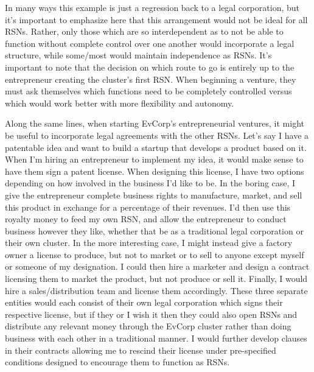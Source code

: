 \documentclass{article}[10pt]
\begin{document}
In many ways this example is just a regression back to a legal corporation, but it's important to emphasize here that this arrangement would not be ideal for all RSNs.
Rather, only those which are so interdependent as to not be able to function without complete control over one another would incorporate a legal structure, while some/most would maintain independence as RSNs.
It's important to note that the decision on which route to go is entirely up to the entrepreneur creating the cluster's first RSN.
When beginning a venture, they must ask themselves which functions need to be completely controlled versus which would work better with more flexibility and autonomy.\par

Along the same lines, when starting EvCorp's entrepreneurial ventures, it might be useful to incorporate legal agreements with the other RSNs.
Let's say I have a patentable idea and want to build a startup that develops a product based on it.
When I'm hiring an entrepreneur to implement my idea, it would make sense to have them sign a patent license.
When designing this license, I have two options depending on how involved in the business I'd like to be.
In the boring case, I give the entrepreneur complete business rights to manufacture, market, and sell this product in exchange for a percentage of their revenues.
I'd then use this royalty money to feed my own RSN, and allow the entrepreneur to conduct business however they like, whether that be as a traditional legal corporation or their own cluster.
In the more interesting case, I might instead give a factory owner a license to produce, but not to market or to sell to anyone except myself or someone of my designation.
I could then hire a marketer and design a contract licensing them to market the product, but not produce or sell it.
Finally, I would hire a sales/distribution team and license them accordingly.
These three separate entities would each consist of their own legal corporation which signs their respective license, but if they or I wish it then they could also open RSNs and distribute any relevant money through the EvCorp cluster rather than doing business with each other in a traditional manner.
I would further develop clauses in their contracts allowing me to rescind their license under pre-specified conditions designed to encourage them to function as RSNs.\par
\end{document}
